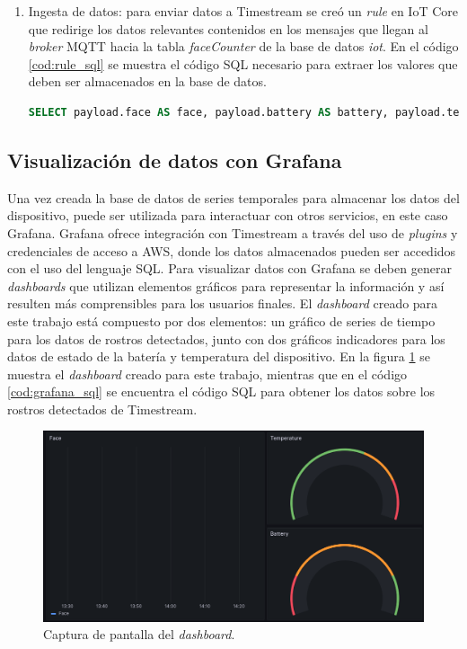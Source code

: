 \begin{enumerate}
	\item Ingesta de datos: para enviar datos a Timestream se creó un \textit{rule} en IoT Core que redirige los datos relevantes contenidos en los mensajes que llegan al \textit{broker} MQTT hacia la tabla \textit{faceCounter} de la base de datos \textit{iot}. En el código \ref{cod:rule_sql} se muestra el código SQL necesario para extraer los valores que deben ser almacenados en la base de datos.
\begin{lstlisting}[language=SQL, label=cod:rule_sql,caption=Código SQL del \textit{rule} para alcenar datos en Timestream.]
SELECT payload.face AS face, payload.battery AS battery, payload.temperature AS temperature FROM 'faceCounter/data_in'
\end{lstlisting}	
	
\end{enumerate}

\subsection{Visualización de datos con Grafana}
Una vez creada la base de datos de series temporales para almacenar los datos del dispositivo, puede ser utilizada para interactuar con otros servicios, en este caso Grafana. Grafana ofrece integración con Timestream a través del uso de \textit{plugins} y credenciales de acceso a AWS, donde los datos almacenados pueden ser accedidos con el uso del lenguaje SQL. Para visualizar datos con Grafana se deben generar \textit{dashboards} que utilizan elementos gráficos para representar la información y así resulten más comprensibles para los usuarios finales. El \textit{dashboard} creado para este trabajo está compuesto por dos elementos: un gráfico de series de tiempo para los datos de rostros detectados, junto con dos gráficos indicadores para los datos de estado de la batería y temperatura del dispositivo. En la figura \ref{fig:gr_dashboard} se muestra el \textit{dashboard} creado para este trabajo, mientras que en el código \ref{cod:grafana_sql} se encuentra el código SQL para obtener los datos sobre los rostros detectados de Timestream.

\begin{figure}[h]
	\centering
	\includegraphics[scale=0.35]{./Figures/cc_dashboard.png}
	\caption{Captura de pantalla del \textit{dashboard}.}
	\label{fig:gr_dashboard}
\end{figure}


